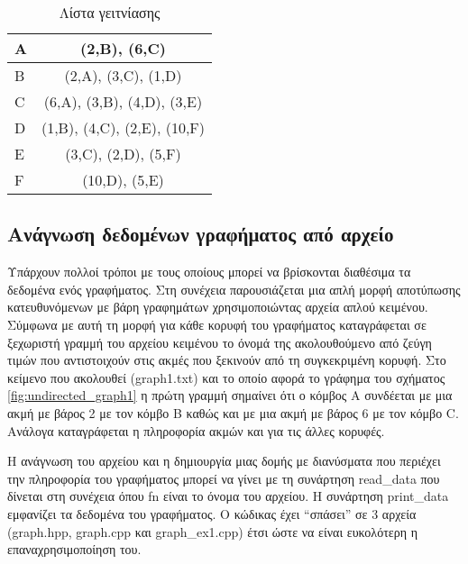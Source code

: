 \begin{table}[ht]
	\centering
	\begin{tabular}{|
		>{\columncolor[HTML]{C0C0C0}}l |c|}
		\hline
		A & (2,B), (6,C)                \\ \hline
		B & (2,A), (3,C), (1,D)         \\ \hline
		C & (6,A), (3,B), (4,D), (3,E)  \\ \hline
		D & (1,B), (4,C), (2,E), (10,F) \\ \hline
		E & (3,C), (2,D), (5,F)         \\ \hline
		F & (10,D), (5,E)               \\ \hline
	\end{tabular}
	\caption{Λίστα γειτνίασης}
	\label{tbl:adjacency_list}
\end{table}

\subsection{Ανάγνωση δεδομένων γραφήματος από αρχείο}
Υπάρχουν πολλοί τρόποι με τους οποίους μπορεί να βρίσκονται διαθέσιμα τα δεδομένα ενός γραφήματος. Στη συνέχεια παρουσιάζεται μια απλή μορφή αποτύπωσης κατευθυνόμενων με βάρη γραφημάτων χρησιμοποιώντας αρχεία απλού κειμένου. Σύμφωνα με αυτή τη μορφή για κάθε κορυφή του γραφήματος καταγράφεται σε ξεχωριστή γραμμή του αρχείου κειμένου το όνομά της ακολουθούμενο από ζεύγη τιμών που αντιστοιχούν στις ακμές που ξεκινούν από τη συγκεκριμένη κορυφή. Στο κείμενο που ακολουθεί (graph1.txt) και το οποίο αφορά το γράφημα του σχήματος \ref{fig:undirected_graph1} η πρώτη γραμμή σημαίνει ότι ο κόμβος Α συνδέεται με μια ακμή με βάρος 2 με τον κόμβο B καθώς και με μια ακμή με βάρος 6 με τον κόμβο C. Ανάλογα καταγράφεται η πληροφορία ακμών και για τις άλλες κορυφές.



Η ανάγνωση του αρχείου και η δημιουργία μιας δομής με διανύσματα που περιέχει την πληροφορία του γραφήματος μπορεί να γίνει με τη συνάρτηση read\_data που δίνεται στη συνέχεια όπου fn είναι το όνομα του αρχείου. Η συνάρτηση print\_data εμφανίζει τα δεδομένα του γραφήματος. Ο κώδικας έχει ``σπάσει'' σε 3 αρχεία (graph.hpp, graph.cpp και graph\_ex1.cpp) έτσι ώστε να είναι ευκολότερη η επαναχρησιμοποίηση του.



